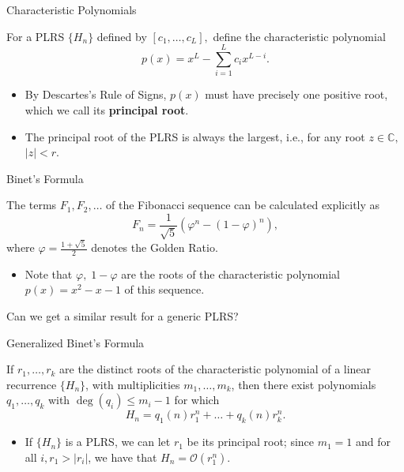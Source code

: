 \documentclass{beamer}
\renewcommand{\C}{\mathbb{C}}
\begin{document}
\begin{frame}{Characteristic Polynomials}
\begin{definition}
	For a PLRS $\{ H_{n} \}$ defined by $[c_1,\ldots , c_{L}],$ define the characteristic polynomial
	\[
	p(x)=x^{L}-\sum_{i=1}^{L}c_{i}x^{L-i}
	.\] 
\end{definition}
\pause
\begin{itemize}
\item
 By Descartes's Rule of Signs, $p(x)$ must have precisely one positive root, which we call its \textbf{principal root}. 
 \pause
\item
The principal root of the PLRS is always the largest, i.e., for any root $z\in \C,$ $\left| z \right|<r$. 
\end{itemize}

\end{frame}
\begin{frame}{Binet's Formula}
\begin{theorem}[Binet]
The terms $F_1,F_2,\ldots $ of the Fibonacci sequence can be calculated explicitly as \[
	F_{n}=\frac{1}{\sqrt{5}}\left( \varphi^{n}-\left( 1-\varphi  \right) ^{n} \right) 
,\] 
where $\varphi=\frac{1+\sqrt{5}}{2}$ denotes the Golden Ratio. 	
\end{theorem}
\pause
\begin{itemize}
\item
	Note that $\varphi ,\; 1-\varphi $ are the roots of the characteristic polynomial $p(x)=x^2-x-1$ of this sequence. 
\end{itemize}
\pause
Can we get a similar result for a generic PLRS?
\end{frame}

\begin{frame}{Generalized Binet's Formula}
	\begin{theorem}
If $r_1,\ldots , r_{k}$ are the distinct roots of the characteristic polynomial of a linear recurrence $\{ H_{n} \}$, with multiplicities  $m_1,\ldots , m_{k}$, then there exist polynomials $q_1,\ldots , q_{k}$ with $\deg (q_i) \leq m_{i}-1$ for which \[
	H_{n}=q_1(n)r_1^{n}+\ldots +q_{k}(n)r_{k}^{n}
.\] 

\end{theorem}
\pause
	\begin{itemize}
\item
	If $\{ H_{n} \}$ is a PLRS, we can let $r_1$ be its principal root; since $m_1=1$ and for all $ i, r_1>|r_{i}|$, we have that $H_{n}=\mathcal{O}(r_1^{n})$.
\end{itemize}
\end{frame}
\end{document}
